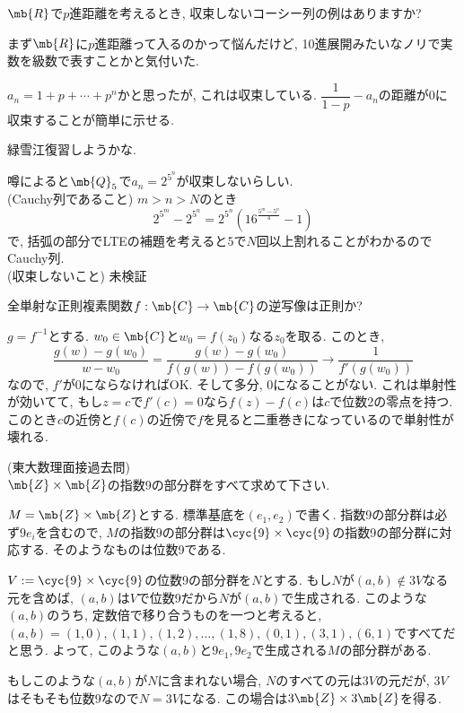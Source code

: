 \begin{prob}
$\mb{R}$で$p$進距離を考えるとき, 収束しないコーシー列の例はありますか?
\end{prob}
まず$\mb{R}$に$p$進距離って入るのかって悩んだけど, 10進展開みたいなノリで実数を級数で表すことかと気付いた. 
\begin{miss}
$a_n = 1+p+\cdots + p^n$かと思ったが, これは収束している. $\dfrac{1}{1-p} - a_n$の距離が0に収束することが簡単に示せる. 
\end{miss}
緑雪江復習しようかな. 
\begin{ans}
噂によると$\mb{Q}_{5}$で$a_n=2^{5^n}$が収束しないらしい.\\
(Cauchy列であること) $m>n>N$のとき
\[2^{5^{m}}  - 2^{5^n} = 2^{5^n}(16^{\frac{5^m - 5^n}{4}} - 1) \]
で, 括弧の部分でLTEの補題を考えると$5$で$N$回以上割れることがわかるのでCauchy列. \\
(収束しないこと) 未検証
\end{ans}

\begin{prob}
全単射な正則複素関数$f:\mb{C}\to \mb{C}$の逆写像は正則か? 
\end{prob}

\begin{ans}
$g=f^{-1}$とする. $w_0\in \mb{C}$と$w_0 =f(z_0)$なる$z_0$を取る. このとき, 
\[\dfrac{g(w) - g(w_0)}{w-w_0} = \dfrac{g(w) - g(w_0)}{f(g(w)) - f(g(w_0))} \to \dfrac{1}{f'(g(w_0))} \]
なので, $f'$が0にならなければOK. そして多分, 0になることがない. これは単射性が効いてて, もし$z=c$で$f'(c) = 0$なら$f(z) - f(c)$は$c$で位数2の零点を持つ. このとき$c$の近傍と$f(c)$の近傍で$f$を見ると二重巻きになっているので単射性が壊れる. 
\end{ans}

\begin{prob} (東大数理面接過去問)\\
$\mb{Z}\times \mb{Z}$の指数9の部分群をすべて求めて下さい. 
\end{prob}

\begin{ans} $M=\mb{Z}\times \mb{Z}$とする. 標準基底を$(e_1,e_2)$で書く. 指数9の部分群は必ず$9e_i$を含むので, $M$の指数9の部分群は$\cyc{9}\times \cyc{9}$の指数9の部分群に対応する. そのようなものは位数9である.\par 
$V := \cyc{9}\times \cyc{9}$の位数9の部分群を$N$とする. もし$N$が$(a,b)\notin 3V$なる元を含めば, $(a,b)$は$V$で位数9だから$N$が$(a,b)$で生成される. このような$(a,b)$のうち, 定数倍で移り合うものを一つと考えると, $(a,b) = (1,0), (1,1), (1,2),\dots, (1,8), (0,1), (3,1), (6,1)$ですべてだと思う. よって,  このような$(a,b)$と$9e_1,9e_2$で生成される$M$の部分群がある. \par 
もしこのような$(a,b)$が$N$に含まれない場合, $N$のすべての元は$3V$の元だが, $3V$はそもそも位数9なので$N=3V$になる. この場合は$3\mb{Z}\times 3\mb{Z}$を得る. 
\end{ans}

